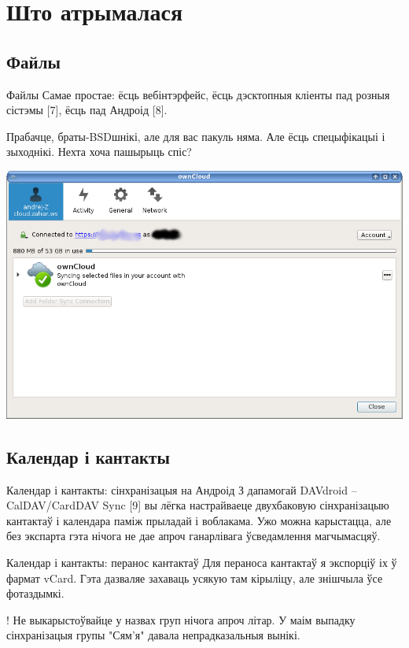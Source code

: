 \documentclass[ignorenonframetext,hyperref={pdftex,unicode}]{beamer}
\begin{document}
\section{Што атрымалася}
\subsection{Файлы}
\begin{frame}{Файлы}
	Самае простае: ёсць вебінтэрфейс, ёсць дэсктопныя кліенты пад розныя сістэмы [7], ёсць пад Андроід [8]. 

	Прабачце, браты-BSDшнікі, але для вас пакуль няма. Але ёсць спецыфікацыі і зыходнікі. Нехта хоча пашырыць спіс?
	
	\begin{center}
 		\includegraphics[height=0.6\textheight,keepaspectratio]{d_client}
	\end{center}
\end{frame}

\subsection{Календар і кантакты}
\begin{frame}{Календар і кантакты: сінхранізацыя на Андроід}
	З дапамогай DAVdroid – CalDAV/CardDAV Sync [9] вы лёгка настрайваеце двухбаковую сінхранізацыю кантактаў і календара паміж прыладай і воблакама. Ужо можна карыстацца, але без экспарта гэта нічога не дае апроч ганарлівага ўсведамлення магчымасцяў.
\end{frame}

\begin{frame}{Календар і кантакты: перанос кантактаў}
	Для пераноса кантактаў я экспорціў іх ў фармат vCard. Гэта дазваляе захаваць усякую там кірыліцу, але знішчыла ўсе фотаздымкі.

	{!} Не выкарыстоўвайце у назвах груп нічога апроч літар. У маім выпадку сінхранізацыя групы "Сям'я" давала непрадказальныя вынікі.
\end{frame}
\end{document}

